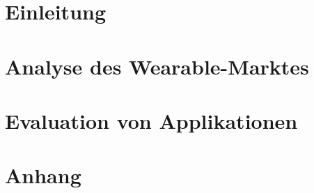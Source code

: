 \documentclass[
	a4paper,				%
	10pt,					%
	oneside,				%
	openright,				%
	notitlepage,			%
	parskip=half,			%
]{scrreprt}					%
\begin{document}

\part{Einleitung}
\label{part:teil1}
\onecolumn


\part{Analyse des Wearable-Marktes}
\label{part:teil2}
\onecolumn


\part{Evaluation von Applikationen}
\label{part:teil3}
\onecolumn

\part{Anhang}
\label{part:anhang}
\onecolumn
\appendix
{}



\cleardoublepage
{} 
{}
\renewcommand{\glossaryname}{Glossar}
\printglossary

\cleardoublepage
{} 
{}

{}


\end{document}
